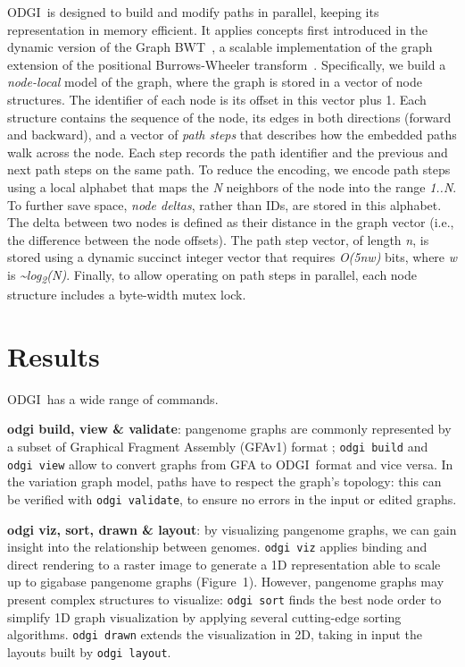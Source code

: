 \documentclass{bioinfo}
\newcommand{\odgi}{ODGI}
\newcommand{\cmd}[1]{{\texttt{#1}}}
\newcommand{\cmdbf}[1]{{\textbf{#1}}}
\newcommand{\topic}[1]{{\cmdbf{#1}}:}
\begin{document}
    \odgi\ is designed to build and modify paths in parallel, keeping its representation in memory efficient. It
    applies concepts first introduced in the dynamic version of the Graph BWT~\citep{31406990}, a scalable
    implementation of the graph extension of the positional Burrows-Wheeler transform~\citep{28702075}. Specifically,
    we build a \textit{node-local} model of the graph, where the graph is stored in a vector of node structures.
    The identifier of each node is its offset in this vector plus 1. Each structure contains the sequence of the
    node, its edges in both directions (forward and backward), and a vector of \textit{path steps} that describes
    how the embedded paths walk across the node. Each step records the path identifier and the previous and next
    path steps on the same path. To reduce the encoding, we encode path steps using a local alphabet that maps the
    \textit{N} neighbors of the node into the range \textit{1..N}. To further save space, \textit{node deltas},
    rather than IDs, are stored in this alphabet. The delta between two nodes is defined as their distance in the
    graph vector (i.e., the difference between the node offsets). The path step vector, of length \textit{n}, is
    stored using a dynamic succinct integer vector that requires \textit{O(5nw)} bits, where \textit{w} is
    \textit{\textasciitilde log\textsubscript{2}(N)}. Finally, to allow operating on path steps in parallel, each node
    structure includes a byte-width mutex lock.


    \section{Results}

    \odgi\ has a wide range of commands.

    \topic{odgi build, view \& validate} pangenome graphs are commonly
    represented by a subset of Graphical Fragment Assembly (GFAv1)
    format \citep{GFAv1}; \cmd{odgi build} and \cmd{odgi view} allow
    to convert graphs from GFA to \odgi\ format and vice versa. In the
    variation graph model, paths have to respect the graph's topology:
    this can be verified with \cmd{odgi validate}, to ensure no
    errors in the input or edited graphs.

    \topic{odgi viz, sort, drawn \& layout} by visualizing pangenome
    graphs, we can gain insight into the relationship between
    genomes. \cmd{odgi viz} applies binding and direct rendering to
    a raster image to generate a 1D representation able to scale up to
    gigabase pangenome graphs (Figure~1\vphantom{\ref{fig:1}}).
    However, pangenome graphs may present complex structures to
    visualize: \cmd{odgi sort} finds the best node order to simplify
    1D graph visualization by applying several cutting-edge sorting
    algorithms. \cmd{odgi drawn} extends the visualization in 2D,
    taking in input the layouts built by \cmd{odgi layout}.
\end{document}
